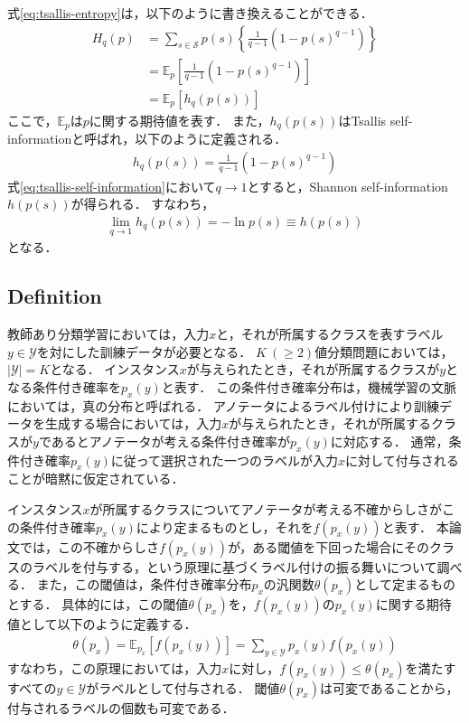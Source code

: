 \documentclass[a4paper,conference]{IEEEtran}
\begin{document}
式\eqref{eq:tsallis-entropy}は，以下のように書き換えることができる．
\begin{align}
    H_{q}(p)
    &= \sum_{s \in \mathcal{S}}p(s)\left\{\frac{1}{q-1}(1-p(s)^{q-1})\right\}\nonumber\\
    &=\mathbb{E}_{p}\left[\frac{1}{q-1}\left(1 - p(s)^{q-1}\right)\right]\nonumber\\
    &= \mathbb{E}_{p}[h_{q}(p(s))]
\end{align}
ここで，$\mathbb{E}_{p}$は$p$に関する期待値を表す．
また，$h_{q}(p(s))$はTsallis self-informationと呼ばれ，以下のように定義される．
\begin{align}
    h_{q}(p(s)) = \frac{1}{q-1}\left(1 - p(s)^{q-1}\right)\label{eq:tsallis-self-information}
\end{align}
式\eqref{eq:tsallis-self-information}において$q \rightarrow 1$とすると，Shannon self-information $h(p(s))$が得られる．
すなわち，
\begin{align}
    \lim_{q \rightarrow 1}h_{q}(p(s)) = - \ln p(s) \equiv h(p(s))\label{eq:shannon-self-information}
\end{align}
となる．

\subsection{Definition}
教師あり分類学習においては，入力$x$と，それが所属するクラスを表すラベル$y \in \mathcal{Y}$を対にした訓練データが必要となる．
$K~(\geq2)$値分類問題においては，$|\mathcal{Y}| = K$となる．
インスタンス$x$が与えられたとき，それが所属するクラスが$y$となる条件付き確率を$p_{x}(y)$と表す．
この条件付き確率分布は，機械学習の文脈においては，真の分布と呼ばれる．
アノテータによるラベル付けにより訓練データを生成する場合においては，入力$x$が与えられたとき，それが所属するクラスが$y$であるとアノテータが考える条件付き確率が$p_{x}(y)$に対応する．
通常，条件付き確率$p_{x}(y)$に従って選択された一つのラベルが入力$x$に対して付与されることが暗黙に仮定されている．

インスタンス$x$が所属するクラスについてアノテータが考える不確からしさがこの条件付き確率$p_{x}(y)$により定まるものとし，それを$f(p_{x}(y))$と表す．
本論文では，この不確からしさ$f(p_{x}(y))$が，ある閾値を下回った場合にそのクラスのラベルを付与する，という原理に基づくラベル付けの振る舞いについて調べる．
また，この閾値は，条件付き確率分布$p_{x}$の汎関数$\theta(p_{x})$として定まるものとする．
具体的には，この閾値$\theta(p_{x})$を，$f(p_{x}(y))$の$p_{x}(y)$に関する期待値として以下のように定義する．
\begin{align}
    \theta(p_{x})
    = \mathbb{E}_{p_{x}}[f(p_{x}(y))]
    = \sum_{y \in \mathcal{Y}}p_{x}(y)f(p_{x}(y))
\end{align}
すなわち，この原理においては，入力$x$に対し，$f(p_{x}(y)) \le \theta(p_{x})$を満たすすべての$y \in \mathcal{Y}$がラベルとして付与される．
閾値$\theta(p_{x})$は可変であることから，付与されるラベルの個数も可変である．
\end{document}

